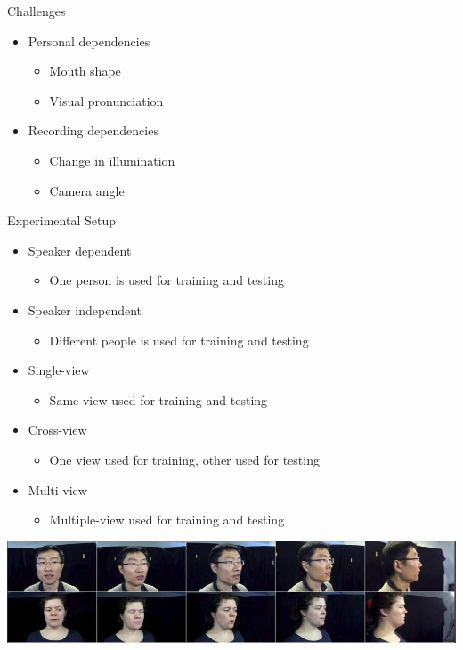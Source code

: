 \documentclass[xcolor=table]{beamer}
\begin{document}
\begin{frame}{Challenges}
    \begin{itemize}
        \item Personal dependencies
        \begin{itemize}
            \item Mouth shape 
            \item Visual pronunciation  
        \end{itemize}
        \item Recording dependencies 
        \begin{itemize}
            \item Change in illumination 
            \item Camera angle
        \end{itemize}
    \end{itemize}
\end{frame}

\begin{frame}{Experimental Setup}
    \begin{itemize}
        \item Speaker dependent
        \begin{itemize}
        \item One person is used for training and testing
        \end{itemize}
        \item Speaker independent
        \begin{itemize}
        \item Different people is used for training and testing
        \end{itemize}
    \end{itemize}
    \begin{itemize}
        \item Single-view 
        \begin{itemize}
        \item Same view used for training and testing
        \end{itemize}
        \item Cross-view 
        \begin{itemize}
        \item One view used for training, other used for testing
        \end{itemize}
        \item Multi-view 
        \begin{itemize}
        \item Multiple-view used for training and testing
        \end{itemize}
    \end{itemize}
    \begin{center}
    \includegraphics[width=\textwidth]{fig/ouluFullView.jpg}   
    \end{center}
\end{frame}
\end{document}
